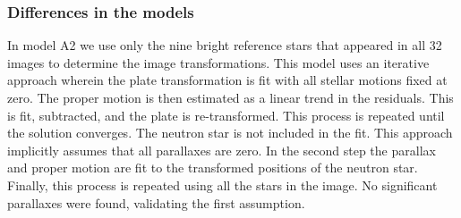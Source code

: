 \documentclass[12pt,preprint]{aastex}
\begin{document}

\subsubsection{Differences in the models}

In model A2 we use only the nine bright reference stars that appeared in all 32
images to determine the image transformations.
This model uses an iterative approach wherein the plate
transformation is fit with all stellar motions fixed at zero. The proper
motion is then estimated as a linear trend in the residuals.
This is fit, subtracted,
and the plate is re-transformed. This process is repeated until the solution
converges. The neutron star is not included in the fit. This approach
implicitly
assumes that all parallaxes are zero. In the second step the 
parallax and proper motion are fit to the transformed positions of the neutron
star. 
Finally, this process is repeated using all the stars in the image.
No significant parallaxes were found, validating the first assumption. 

\end{document}
